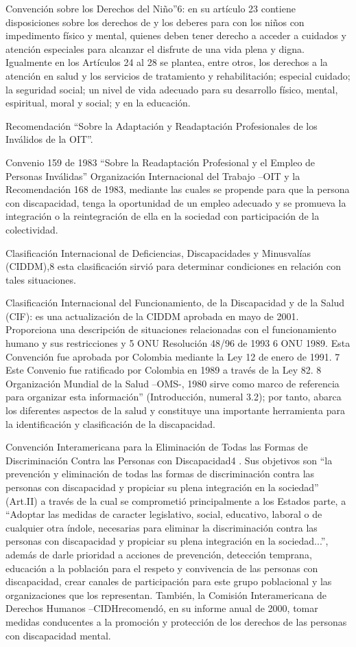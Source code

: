 \documentclass[a4paper, 12pt, oneside]{article}
\begin{document}
	Convención sobre los Derechos del Niño”6: en su artículo 23 contiene disposiciones sobre los derechos de y los deberes para con los niños con impedimento físico y mental, quienes deben tener derecho a acceder a cuidados y atención especiales para alcanzar el disfrute de una vida plena y digna. Igualmente en los Artículos 24 al 28 se plantea, entre otros, los derechos a la atención en salud y los servicios de tratamiento y rehabilitación; especial cuidado; la seguridad social; un nivel de vida adecuado para su desarrollo físico, mental, espiritual, moral y social; y en la educación.

	Recomendación “Sobre la Adaptación y Readaptación Profesionales de los Inválidos de la OIT”.

	Convenio 159 de 1983 “Sobre la Readaptación Profesional y el Empleo de Personas Inválidas” Organización Internacional del Trabajo –OIT y la Recomendación 168 de 1983, mediante las cuales se propende para que la persona con discapacidad, tenga la oportunidad de un empleo adecuado y se promueva la integración o la reintegración de ella en la sociedad con participación de la colectividad.

	Clasificación Internacional de Deficiencias, Discapacidades y Minusvalías (CIDDM),8 esta clasificación sirvió para determinar condiciones en relación con tales situaciones.

	Clasificación Internacional del Funcionamiento, de la Discapacidad y de la Salud (CIF): es una actualización de la CIDDM aprobada en mayo de 2001. Proporciona una descripción de situaciones relacionadas con el funcionamiento humano y sus restricciones y 5 ONU Resolución 48/96 de 1993 6 ONU 1989. Esta Convención fue aprobada por Colombia mediante la Ley 12 de enero de 1991. 7 Este Convenio fue ratificado por Colombia en 1989 a través de la Ley 82. 8 Organización Mundial de la Salud –OMS-, 1980 sirve como marco de referencia para organizar esta información” (Introducción, numeral 3.2); por tanto, abarca los diferentes aspectos de la salud y constituye una importante herramienta para la identificación y clasificación de la discapacidad.

	Convención Interamericana para la Eliminación de Todas las Formas de Discriminación Contra las Personas con Discapacidad4 . Sus objetivos son “la prevención y eliminación de todas las formas de discriminación contra las personas con discapacidad y propiciar su plena integración en la sociedad” (Art.II) a través de la cual se comprometió principalmente a los Estados parte, a “Adoptar las medidas de caracter legislativo, social, educativo, laboral o de cualquier otra índole, necesarias para eliminar la discriminación contra las personas con discapacidad y propiciar su plena integración en la sociedad...”, además de darle prioridad a acciones de prevención, detección temprana, educación a la población para el respeto y convivencia de las personas con discapacidad, crear canales de participación para este grupo poblacional y las organizaciones que los representan. También, la Comisión Interamericana de Derechos Humanos –CIDHrecomendó, en su informe anual de 2000, tomar medidas conducentes a la promoción y protección de los derechos de las personas con discapacidad mental.
\end{document}
